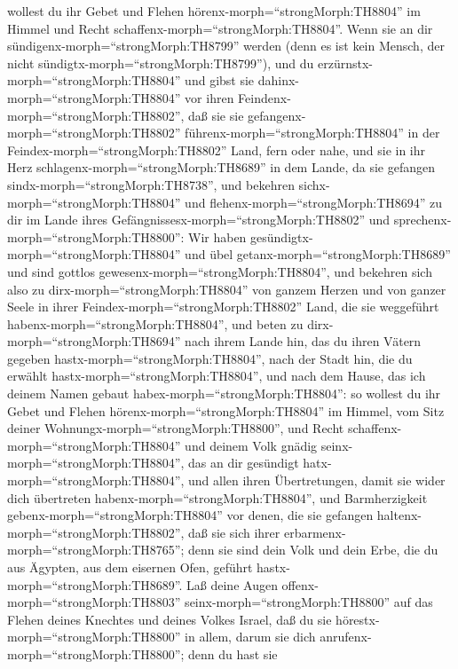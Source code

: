 wollest du ihr Gebet und Flehen hörenx-morph=``strongMorph:TH8804'' im
Himmel und Recht schaffenx-morph=``strongMorph:TH8804''. 
Wenn sie an dir sündigenx-morph=``strongMorph:TH8799'' werden (denn es
ist kein Mensch, der nicht sündigtx-morph=``strongMorph:TH8799''), und
du erzürnstx-morph=``strongMorph:TH8804'' und gibst sie
dahinx-morph=``strongMorph:TH8804'' vor ihren
Feindenx-morph=``strongMorph:TH8802'', daß sie sie
gefangenx-morph=``strongMorph:TH8802''
führenx-morph=``strongMorph:TH8804'' in der
Feindex-morph=``strongMorph:TH8802'' Land, fern oder nahe, 
und sie in ihr Herz schlagenx-morph=``strongMorph:TH8689'' in dem Lande,
da sie gefangen sindx-morph=``strongMorph:TH8738'', und bekehren
sichx-morph=``strongMorph:TH8804'' und
flehenx-morph=``strongMorph:TH8694'' zu dir im Lande ihres
Gefängnissesx-morph=``strongMorph:TH8802'' und
sprechenx-morph=``strongMorph:TH8800'': Wir haben
gesündigtx-morph=``strongMorph:TH8804'' und übel
getanx-morph=``strongMorph:TH8689'' und sind gottlos
gewesenx-morph=``strongMorph:TH8804'',  und bekehren sich
also zu dirx-morph=``strongMorph:TH8804'' von ganzem Herzen und von
ganzer Seele in ihrer Feindex-morph=``strongMorph:TH8802'' Land, die sie
weggeführt habenx-morph=``strongMorph:TH8804'', und beten zu
dirx-morph=``strongMorph:TH8694'' nach ihrem Lande hin, das du ihren
Vätern gegeben hastx-morph=``strongMorph:TH8804'', nach der Stadt hin,
die du erwählt hastx-morph=``strongMorph:TH8804'', und nach dem Hause,
das ich deinem Namen gebaut habex-morph=``strongMorph:TH8804'':
 so wollest du ihr Gebet und Flehen
hörenx-morph=``strongMorph:TH8804'' im Himmel, vom Sitz deiner
Wohnungx-morph=``strongMorph:TH8800'', und Recht
schaffenx-morph=``strongMorph:TH8804''  und deinem Volk
gnädig seinx-morph=``strongMorph:TH8804'', das an dir gesündigt
hatx-morph=``strongMorph:TH8804'', und allen ihren Übertretungen, damit
sie wider dich übertreten habenx-morph=``strongMorph:TH8804'', und
Barmherzigkeit gebenx-morph=``strongMorph:TH8804'' vor denen, die sie
gefangen haltenx-morph=``strongMorph:TH8802'', daß sie sich ihrer
erbarmenx-morph=``strongMorph:TH8765'';  denn sie sind dein
Volk und dein Erbe, die du aus Ägypten, aus dem eisernen Ofen, geführt
hastx-morph=``strongMorph:TH8689''.  Laß deine Augen
offenx-morph=``strongMorph:TH8803'' seinx-morph=``strongMorph:TH8800''
auf das Flehen deines Knechtes und deines Volkes Israel, daß du sie
hörestx-morph=``strongMorph:TH8800'' in allem, darum sie dich
anrufenx-morph=``strongMorph:TH8800'';  denn du hast sie
